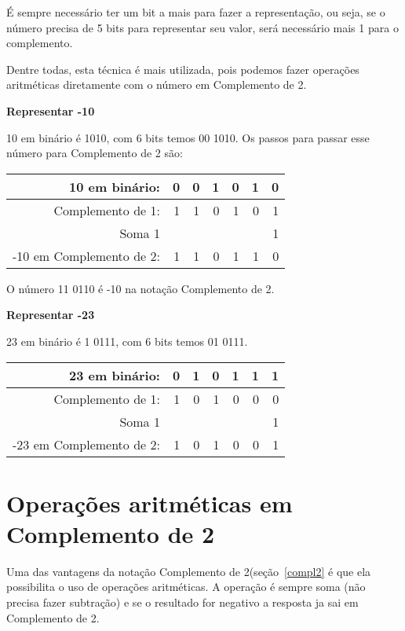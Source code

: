 É sempre necessário ter um bit a mais para fazer a representação, ou seja, se o número precisa de 5 bits para representar seu valor, será necessário mais 1 para o complemento.

Dentre todas, esta técnica é mais utilizada, pois podemos fazer operações aritméticas diretamente com o número em Complemento de 2. 

\noindent\textbf{Representar -10}

10 em binário é 1010, com 6 bits temos 00 1010. Os passos para passar esse número para Complemento de 2 são:

\begin{table}[h]
	\centering
	\begin{tabular}{|r|r|r|r|r|r|r|}
		\hline
		10 em binário: 			& 0 & 0 & 1  & 0 &  1 & 0 \\
		\hline
		Complemento de 1: 		& 1 & 1 & 0 & 1 & 0 & 1 \\
		\hline
		Soma 1 					&  	&  	&  	&	&	& 1 \\
		\hline
		\hline
		-10 em Complemento de 2:	& 1 & 1 & 0	& 1 & 1 & 0 \\
		\hline
	\end{tabular}
\end{table}
O número 11 0110 é -10 na notação Complemento de 2.

\noindent\textbf{Representar -23}

23 em binário é 1 0111, com 6 bits temos 01 0111. 
\begin{table}[h]
	\centering
	\begin{tabular}{|r|r|r|r|r|r|r|}
		\hline
		23 em binário: 			& 0 & 1 & 0  & 1 & 1 & 1 \\
		\hline
		Complemento de 1: 		& 1 & 0 & 1  & 0 & 0 & 0 \\
		\hline
		Soma 1 					&  	&  	&  	&	&	 & 1 \\
		\hline
		\hline
		-23 em Complemento de 2:	& 1 & 0 & 1	& 0 & 0 & 1 \\
		\hline
	\end{tabular}
\end{table}


\section{Operações aritméticas em Complemento de 2}
\label{aritmeticaCompl2}

Uma das vantagens da notação Complemento de 2(seção~\ref{compl2} é que ela possibilita o uso de operações aritméticas. A operação é sempre soma (não precisa fazer subtração) e se o resultado for negativo a resposta ja sai em Complemento de 2.

